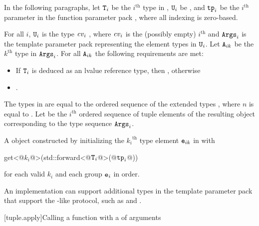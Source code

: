 \begin{itemdescr}
\pnum
In the following paragraphs, let $\texttt{T}_i$ be the $i^\text{th}$ type in ,
$\texttt{U}_i$ be , and $\texttt{tp}_i$ be the $i^\text{th}$
parameter in the function parameter pack , where all indexing is
zero-based.

\pnum
\expects
For all $i$, $\texttt{U}_i$ is the type
$\cv_i$ , where $\cv_i$ is the (possibly empty) $i^\text{th}$
 and $\texttt{Args}_i$ is the template parameter pack representing the element
types in $\texttt{U}_i$. Let $\texttt{A}_{ik}$ be the ${k}^\text{th}$ type in $\texttt{Args}_i$. For all
$\texttt{A}_{ik}$ the following requirements are met:
\begin{itemize}
\item If $\texttt{T}_i$ is deduced as an lvalue reference type, then
      , otherwise
\item {}.
\end{itemize}

\pnum
\remarks
The types in  are equal to the ordered
sequence of the extended types
,
where $n$ is
equal to . Let  be the $i^\text{th}$
ordered sequence of tuple elements of the resulting  object
corresponding to the type sequence $\texttt{Args}_i$.

\pnum
\returns
A  object constructed by initializing the ${k_i}^\text{th}$
type element $\texttt{e}_{ik}$ in  with
\begin{codeblock}
get<@$k_i$@>(std::forward<@$\texttt{T}_i$@>(@$\texttt{tp}_i$@))
\end{codeblock}
for each valid $k_i$ and each group $\texttt{e}_i$ in order.

\pnum
\begin{note}
An implementation can support additional types in the template parameter
pack  that support the -like protocol, such as
 and .
\end{note}
\end{itemdescr}

[tuple.apply]{Calling a function with a  of arguments}

